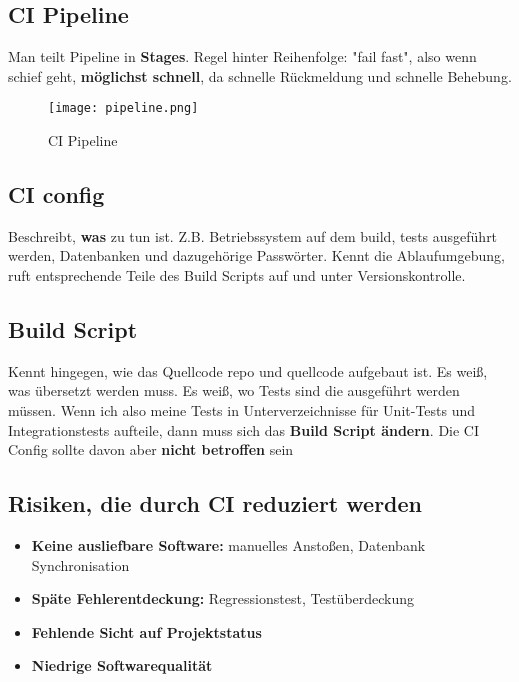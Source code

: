 \documentclass{book}
\begin{document}
    \subsection{CI Pipeline}
    Man teilt Pipeline in \textbf{Stages}. Regel hinter Reihenfolge: "fail fast", also wenn schief geht, \textbf{möglichst schnell}, da schnelle Rückmeldung und schnelle Behebung.
    \begin{figure}[H]
        \centering
        \texttt{[image: pipeline.png]}
        \caption{CI Pipeline}
        \label{fig:enter-label}

    \end{figure}
    \subsection{CI config}
    Beschreibt, \textbf{was} zu tun ist. Z.B. Betriebssystem auf dem build, tests ausgeführt werden, Datenbanken und dazugehörige Passwörter.
    \newline Kennt die Ablaufumgebung, ruft entsprechende Teile des Build Scripts auf und unter Versionskontrolle.
    \subsection{Build Script}
    Kennt hingegen, wie das Quellcode repo und quellcode aufgebaut ist. Es weiß, was übersetzt werden muss. Es weiß, wo Tests sind die ausgeführt werden müssen. \newline Wenn ich also meine Tests in
    Unterverzeichnisse für Unit-Tests und Integrationstests aufteile, dann muss sich das \textbf{Build Script ändern}. \newline Die CI
    Config sollte davon aber \textbf{nicht betroffen} sein
    \subsection{Risiken, die durch CI reduziert werden}
    \begin{itemize}
        \item \textbf{Keine ausliefbare Software:} manuelles Anstoßen, Datenbank Synchronisation
        \item \textbf{Späte Fehlerentdeckung:} Regressionstest, Testüberdeckung
        \item \textbf{Fehlende Sicht auf Projektstatus}
        \item \textbf{Niedrige Softwarequalität}
    \end{itemize}
\end{document}
